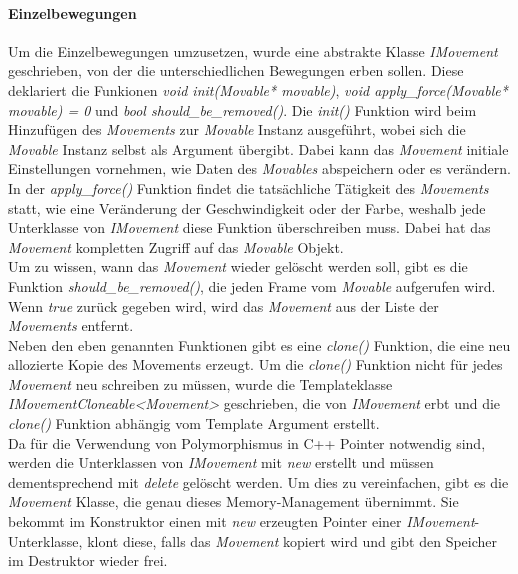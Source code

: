 \documentclass[11pt,a4paper]{article}
\begin{document}
\paragraph{Einzelbewegungen}
Um die Einzelbewegungen umzusetzen, wurde eine abstrakte Klasse \textit{IMovement} geschrieben, von der die unterschiedlichen Bewegungen erben sollen. Diese deklariert die Funkionen \textit{void init(Movable* movable)}, \textit{void apply\_force(Movable* movable) = 0} und \textit{bool should\_be\_removed()}. Die \textit{init()} Funktion wird beim Hinzufügen des \textit{Movements} zur \textit{Movable} Instanz ausgeführt, wobei sich die \textit{Movable} Instanz selbst als Argument übergibt. Dabei kann das \textit{Movement} initiale Einstellungen vornehmen, wie Daten des \textit{Movables} abspeichern oder es verändern.\\
In der \textit{apply\_force()} Funktion findet die tatsächliche Tätigkeit des \textit{Movements} statt, wie eine Veränderung der Geschwindigkeit oder der Farbe, weshalb jede Unterklasse von \textit{IMovement} diese Funktion überschreiben muss. Dabei hat das \textit{Movement} kompletten Zugriff auf das \textit{Movable} Objekt.\\
Um zu wissen, wann das \textit{Movement} wieder gelöscht werden soll, gibt es die Funktion \textit{should\_be\_removed()}, die jeden Frame vom \textit{Movable} aufgerufen wird. Wenn \textit{true} zurück gegeben wird, wird das \textit{Movement} aus der Liste der \textit{Movements} entfernt.\\
Neben den eben genannten Funktionen gibt es eine \textit{clone()} Funktion, die eine neu allozierte Kopie des Movements erzeugt. Um die \textit{clone()} Funktion nicht für jedes \textit{Movement} neu schreiben zu müssen, wurde die Templateklasse \textit{IMovementCloneable\textless Movement\textgreater} geschrieben, die von \textit{IMovement} erbt und die \textit{clone()} Funktion abhängig vom Template Argument erstellt.\\
Da für die Verwendung von Polymorphismus in C++ Pointer notwendig sind, werden die Unterklassen von \textit{IMovement} mit \textit{new} erstellt und müssen dementsprechend mit \textit{delete} gelöscht werden. Um dies zu vereinfachen, gibt es die \textit{Movement} Klasse, die genau dieses Memory-Management übernimmt. Sie bekommt im Konstruktor einen mit \textit{new} erzeugten Pointer einer \textit{IMovement}-Unterklasse, klont diese, falls das \textit{Movement} kopiert wird und gibt den Speicher im Destruktor wieder frei.
\end{document}
